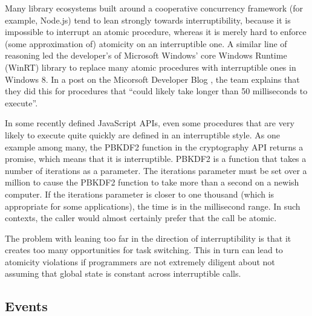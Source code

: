 \documentclass[a4paper,UKenglish,cleveref, autoref]{lipics-v2019}
\begin{document}
Many library ecosystems built around a cooperative concurrency framework (for example, Node.js) tend to lean strongly towards interruptibility, because it is impossible to interrupt an atomic procedure, whereas it is merely hard to enforce (some approximation of) atomicity on an interruptible one.
A similar line of reasoning led the developer's of Microsoft Windows' core Windows Runtime (WinRT) library to replace many atomic procedures with interruptible ones in Windows 8.
In a post on the Micorsoft Developer Blog \cite{Windows8Team2012}, the team explains that they did this for procedures that ``could likely take longer than 50 milliseconds to execute''.

In some recently defined JavaScript APIs, even some procedures that are very likely to execute quite quickly are defined in an interruptible style.
As one example among many, the PBKDF2 function in the cryptography API returns a promise, which means that it is interruptible.
PBKDF2 is a function that takes a number of iterations as a parameter.
The iterations parameter must be set over a million to cause the PBKDF2 function to take more than a second on a newish computer.
If the iterations parameter is closer to one thousand (which is appropriate for some applications), the time is in the millisecond range.
In such contexts, the caller would almost certainly prefer that the call be atomic.

The problem with leaning too far in the direction of interruptibility is that it creates too many opportunities for task switching.
This in turn can lead to atomicity violations if programmers are not extremely diligent about not assuming that global state is constant across interruptible calls.

\subsection{Events}

\end{document}
